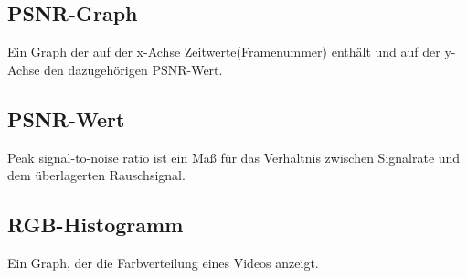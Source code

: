\documentclass[parskip=full]{scrartcl}
\begin{document}
\subsection*{PSNR-Graph} 
Ein Graph der auf der x-Achse Zeitwerte(Framenummer) enthält und auf der y-Achse den dazugehörigen PSNR-Wert.
\subsection*{PSNR-Wert} 
Peak signal-to-noise ratio ist ein Maß für das Verhältnis zwischen Signalrate und dem überlagerten Rauschsignal.
\subsection*{RGB-Histogramm} 
Ein Graph, der die Farbverteilung eines Videos anzeigt.
\end{document}
